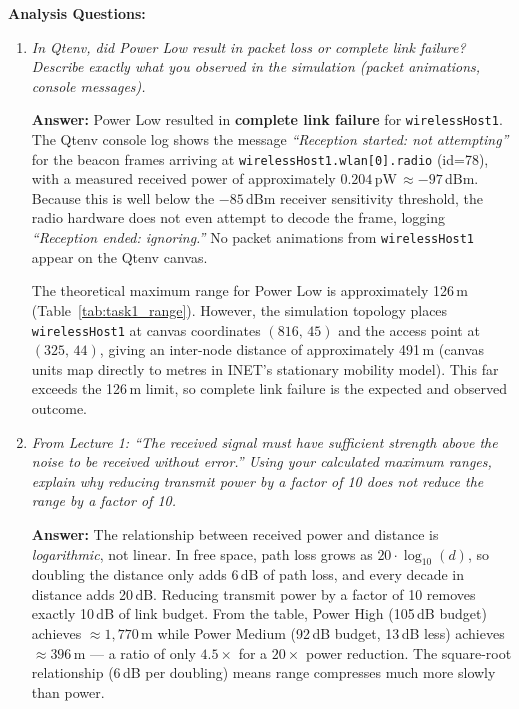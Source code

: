 \documentclass[12pt]{article}
\begin{document}
\textbf{Analysis Questions:}
\begin{enumerate}

    \item \textit{In Qtenv, did Power Low result in packet loss or complete link
          failure? Describe exactly what you observed in the simulation (packet
          animations, console messages).}

    \textbf{Answer:}
    Power Low resulted in \textbf{complete link failure} for
    \texttt{wirelessHost1}. The Qtenv console log shows the message
    \textit{``Reception started: not attempting''} for the beacon frames arriving at
    \texttt{wirelessHost1.wlan[0].radio} (id=78), with a measured received power of
    approximately $0.204$\,pW\,$\approx -97$\,dBm. Because this is well below the
    $-85$\,dBm receiver sensitivity threshold, the radio hardware does not even
    attempt to decode the frame, logging \textit{``Reception ended: ignoring.''}
    No packet animations from \texttt{wirelessHost1} appear on the Qtenv canvas.

    The theoretical maximum range for Power Low is approximately 126\,m (Table~\ref{tab:task1_range}).
    However, the simulation topology places \texttt{wirelessHost1} at canvas
    coordinates $(816,\,45)$ and the access point at $(325,\,44)$, giving an
    inter-node distance of approximately 491\,m (canvas units map directly to metres
    in INET's stationary mobility model). This far exceeds the 126\,m limit, so
    complete link failure is the expected and observed outcome.

    \item \textit{From Lecture 1: ``The received signal must have sufficient strength
          above the noise to be received without error.'' Using your calculated
          maximum ranges, explain why reducing transmit power by a factor of 10 does
          not reduce the range by a factor of 10.}

    \textbf{Answer:}
    The relationship between received power and distance is \textit{logarithmic}, not
    linear. In free space, path loss grows as $20\cdot\log_{10}(d)$, so doubling the
    distance only adds 6\,dB of path loss, and every decade in distance adds 20\,dB.
    Reducing transmit power by a factor of 10 removes exactly 10\,dB of link budget.
    From the table, Power High (105\,dB budget) achieves $\approx 1{,}770$\,m while
    Power Medium (92\,dB budget, 13\,dB less) achieves $\approx 396$\,m --- a ratio
    of only $4.5\times$ for a $20\times$ power reduction. The square-root relationship
    (6\,dB per doubling) means range compresses much more slowly than power.


\end{enumerate}
\end{document}
